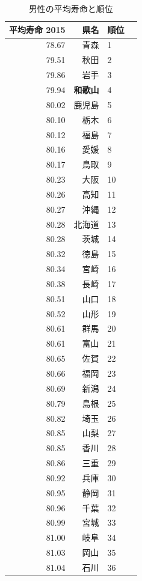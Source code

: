 \begin{table}[ht]
\caption{男性の平均寿命と順位}
\centering
\footnotesize
\begin{tabular}{rrlr}
  \hline
 平均寿命 2015 & 県名 & 順位 \\
  \hline
 78.67 & 青森 &   1 \\
 79.51 & 秋田 &   2 \\
 79.86 & 岩手 &   3 \\
 79.94 & \textbf{和歌山} &   4 \\
 80.02 & 鹿児島 &   5 \\
 80.10 & 栃木 &   6 \\
 80.12 & 福島 &   7 \\
 80.16 & 愛媛 &   8 \\
 80.17 & 鳥取 &   9 \\
 80.23 & 大阪 &  10 \\
 80.26 & 高知 &  11 \\
 80.27 & 沖縄 &  12 \\
 80.28 & 北海道 &  13 \\
 80.28 & 茨城 &  14 \\
 80.32 & 徳島 &  15 \\
 80.34 & 宮崎 &  16 \\
 80.38 & 長崎 &  17 \\
 80.51 & 山口 &  18 \\
 80.52 & 山形 &  19 \\
 80.61 & 群馬 &  20 \\
 80.61 & 富山 &  21 \\
 80.65 & 佐賀 &  22 \\
 80.66 & 福岡 &  23 \\
 80.69 & 新潟 &  24 \\
 80.79 & 島根 &  25 \\
 80.82 & 埼玉 &  26 \\
 80.85 & 山梨 &  27 \\
 80.85 & 香川 &  28 \\
 80.86 & 三重 &  29 \\
 80.92 & 兵庫 &  30 \\
 80.95 & 静岡 &  31 \\
 80.96 & 千葉 &  32 \\
 80.99 & 宮城 &  33 \\
 81.00 & 岐阜 &  34 \\
 81.03 & 岡山 &  35 \\
 81.04 & 石川 &  36 \\

\end{tabular}
\end{table}
